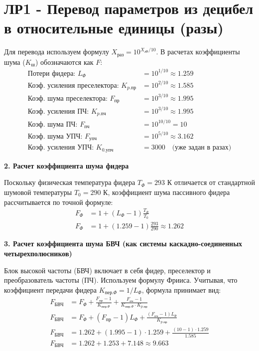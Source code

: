 \section{ЛР1 - Перевод параметров из децибел в относительные единицы (разы)}

Для перевода используем формулу $X_{\text{раз}} = 10^{X_{\text{дБ}}/10}$. В расчетах коэффициенты шума ($K_{\text{ш}}$) обозначаются как $F$:
\begin{align*}
\text{Потери фидера: } L_{\Phi} &= 10^{1/10} \approx 1.259 \\
\text{Коэф. усиления преселектора: } K_{p.\text{пр}} &= 10^{2/10} \approx 1.585 \\
\text{Коэф. шума преселектора: } F_{\text{пр}} &= 10^{3/10} \approx 1.995 \\
\text{Коэф. усиления ПЧ: } K_{p.\text{пч}} &= 10^{3/10} \approx 1.995 \\
\text{Коэф. шума ПЧ: } F_{\text{пч}} &= 10^{10/10} = 10 \\
\text{Коэф. шума УПЧ: } F_{\text{упч}} &= 10^{5/10} \approx 3.162 \\
\text{Коэф. усиления УПЧ: } K_{0.\text{упч}} &= 3000 \quad \text{(уже задан в разах)}
\end{align*}

\vspace{1em}
\textbf{2. Расчет коэффициента шума фидера}

Поскольку физическая температура фидера $T_{\Phi} = 293 \text{ К}$ отличается от стандартной шумовой температуры $T_0 = 290 \text{ К}$, коэффициент шума пассивного фидера рассчитывается по точной формуле:
\begin{align*}
F_{\Phi} &= 1 + (L_{\Phi} - 1) \frac{T_{\Phi}}{T_0} \\
F_{\Phi} &= 1 + (1.259 - 1) \frac{293}{290} \approx 1.262
\end{align*}

\vspace{1em}
\textbf{3. Расчет коэффициента шума БВЧ (как системы каскадно-соединенных четырехполюсников)}

Блок высокой частоты (БВЧ) включает в себя фидер, преселектор и преобразователь частоты (ПЧ). Используем формулу Фрииса. Учитывая, что коэффициент передачи фидера $K_{\text{пер.}\Phi} = 1/L_{\Phi}$, формула принимает вид:
\begin{align*}
F_{\text{БВЧ}} &= F_{\Phi} + \frac{F_{\text{пр}} - 1}{K_{\text{пер.}\Phi}} + \frac{F_{\text{пч}} - 1}{K_{\text{пер.}\Phi} \cdot K_{p.\text{пр}}} \\
F_{\text{БВЧ}} &= F_{\Phi} + (F_{\text{пр}} - 1)L_{\Phi} + \frac{(F_{\text{пч}} - 1)L_{\Phi}}{K_{p.\text{пр}}} \\
F_{\text{БВЧ}} &= 1.262 + (1.995 - 1) \cdot 1.259 + \frac{(10 - 1) \cdot 1.259}{1.585} \\
F_{\text{БВЧ}} &= 1.262 + 1.253 + 7.148 \approx 9.663
\end{align*}


